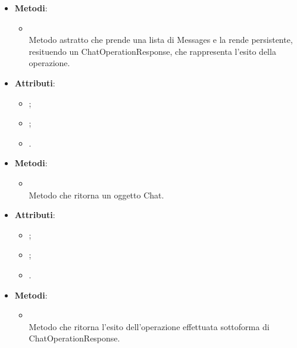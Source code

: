 \documentclass[10pt, a4paper]{article}
\begin{document}
\label{PersistChatPortDettaglio}
\begin{itemize}
    \item \textbf{Metodi}:
    \begin{itemize}
        \item {}\\
        Metodo astratto che prende una lista di Messages e la rende persistente, resituendo un ChatOperationResponse, che rappresenta l'esito della operazione.
    \end{itemize}
\end{itemize}

\label{PostgresChatDettaglio}
\begin{itemize}
    \item \textbf{Attributi}:
    \begin{itemize}
        \item {};
        \item {};
        \item {}.     
    \end{itemize}    
    \item \textbf{Metodi}:
    \begin{itemize}
        \item {}\\
        Metodo che ritorna un oggetto Chat.
    \end{itemize}
\end{itemize}


\label{PostgresChatOperationResponseDettaglio}
\begin{itemize}
    \item \textbf{Attributi}:
    \begin{itemize}
        \item {};
        \item {};
        \item {}.
    \end{itemize}
    \item \textbf{Metodi}:
    \begin{itemize}
        \item {} \\
        Metodo che ritorna l'esito dell'operazione effettuata sottoforma di ChatOperationResponse.
    \end{itemize}
\end{itemize}
\end{document}

